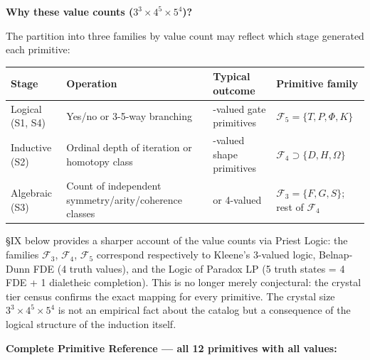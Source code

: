 \documentclass[12pt,a4paper]{article}
\newcommand{\pilcrow}{\S}
\begin{document}
\textbf{Why these value counts ($3^3 \times 4^5 \times 5^4$)?}

The partition into three families by value count may reflect which stage generated each primitive:

\begin{table}[htbp]
\centering
\small
{}
\begin{tabularx}{\textwidth}{>{\centering\arraybackslash}X >{\centering\arraybackslash}X >{\centering\arraybackslash}X >{\centering\arraybackslash}X}
\toprule
\rowcolor{gray!25}\textbf{Stage} & \textbf{Operation} & \textbf{Typical outcome} & \textbf{Primitive family} \\
\midrule
\rowcolors{1}{white}{gray!10}
Logical (S1, S4) & Yes/no or 3-5-way branching & 5-valued gate primitives & $\mathcal{F}_5 = \{T, P, \Phi, K\}$ \\
Inductive (S2) & Ordinal depth of iteration or homotopy class & 4-valued shape primitives & $\mathcal{F}_4 \supset \{D, H, \Omega\}$ \\
Algebraic (S3) & Count of independent symmetry/arity/coherence classes & 3 or 4-valued & $\mathcal{F}_3 = \{F, G, S\}$; rest of $\mathcal{F}_4$ \\
\bottomrule
\end{tabularx}
\end{table}

\pilcrow{}IX below provides a sharper account of the value counts via Priest Logic: the families $\mathcal{F}_3$, $\mathcal{F}_4$, $\mathcal{F}_5$ correspond respectively to Kleene's 3-valued logic, Belnap-Dunn FDE (4 truth values), and the Logic of Paradox LP (5 truth states = 4 FDE + 1 dialetheic completion). This is no longer merely conjectural: the crystal tier census confirms the exact mapping for every primitive. The crystal size $3^3 \times 4^5 \times 5^4$ is not an empirical fact about the catalog but a consequence of the logical structure of the induction itself.

\noindent\textbf{Complete Primitive Reference --- all 12 primitives with all values:}
\end{document}
